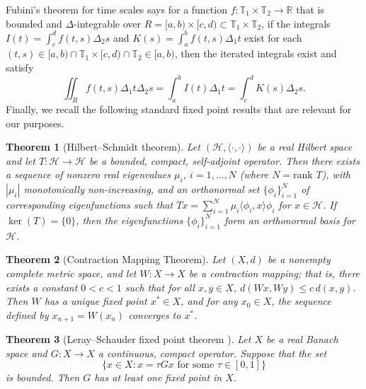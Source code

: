 \documentclass{article}
\newtheorem{theorem}{Theorem}[section]
\numberwithin{equation}{section}
\numberwithin{theorem}{section}
\begin{document}
Fubini's theorem for time scales \cite[Theorem~3.10]{Bohner-Guseinov-Multiple} says for a function $f\colon \mathbb{T}_1 \times \mathbb{T}_2 \to \mathbb{R}$ that is bounded and $\Delta$-integrable over $R = [a,b) \times [c,d) \subset \mathbb{T}_1 \times \mathbb{T}_2$, if the integrals $I(t) = \displaystyle\int_c^d f(t,s) \Delta_2 s$ and $K(s) = \displaystyle\int_a^b f(t,s) \Delta_1 t$
exist for each $(t,s) \in [a,b) \cap\mathbb{T}_1 \times [c,d) \cap\mathbb{T}_2 \in [a,b)$, then the iterated integrals exist and satisfy
\begin{equation}\label{thm:Fubini}
\iint_R f(t,s) \Delta_1 t \Delta_2 s = \displaystyle\int_a^b I(t) \Delta_1 t = \displaystyle\int_c^d K(s) \Delta_2 s .
\end{equation}
Finally, we recall the following standard fixed point results that are relevant for our purposes.
\begin{theorem}[Hilbert--Schmidt theorem]\label{thm:HS}
Let $(\mathscr{H}, \langle \cdot, \cdot \rangle)$ be a real Hilbert space and let $T\colon \mathscr{H} \to \mathscr{H}$ be a bounded, compact, self-adjoint operator. Then there exists a sequence of nonzero real eigenvalues $\mu_i$, $i = 1, \ldots, N$ (where $N=\text{rank } T$), with $|\mu_i|$ monotonically non-increasing, and an orthonormal set $\{\phi_i\}_{i=1}^N$ of corresponding eigenfunctions such that $Tx = \displaystyle\sum_{i=1}^{N} \mu_i \langle \phi_i, x \rangle \phi_i$ for $x \in \mathscr{H}$. If $\ker(T) = \{0\}$, then the eigenfunctions $\{\phi_i\}_{i=1}^N$ form an orthonormal basis for $\mathscr{H}$.
\end{theorem}

\begin{theorem}[Contraction Mapping Theorem]\label{thm:CMT}
Let $(X, d)$ be a nonempty complete metric space, and let $W\colon X \to X$ be a contraction mapping; that is, there exists a constant $0 < c < 1$ such that for all $x, y \in X$, $d(Wx, Wy) \leq c \, d(x, y)$.
Then $W$ has a unique fixed point $x^* \in X$, and for any $x_0 \in X$, the sequence defined by $x_{n+1} = W(x_n)$ converges to $x^*$.
\end{theorem}

\begin{theorem}[Leray--Schauder fixed point theorem {\cite[Ch.~XII]{Kolmogorov-Fomin}}]\label{thm:LS}
Let $X$ be a real Banach space and $G\colon X\to X$ a continuous, compact operator. Suppose that the set
\[
\{x\in X \colon x = \tau Gx \text{ for some } \tau\in[0,1]\}
\]
is bounded. Then $G$ has at least one fixed point in $X$.
\end{theorem}
\end{document}
